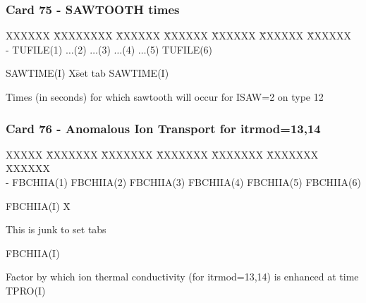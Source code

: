 \newpage \subsubsection{Card 75 - SAWTOOTH times}
\begin{tabbing}
XXXXXX \= XXXXXXXX \= XXXXXX \= XXXXXX \= XXXXXX \= XXXXXX \=
XXXXXX       \\
\footnotesize - \>\footnotesize  TUFILE(1) \>\footnotesize $\ldots$(2) \>\footnotesize
$\ldots$(3) \>\footnotesize $\ldots$(4) \>\footnotesize $\ldots$(5) \>\footnotesize TUFILE(6)
\\
\end{tabbing}
\begin{tabbing}
SAWTIME(I) X\= set tab \kill
SAWTIME(I) \> \parbox[t]{\width}{Times (in seconds) for which sawtooth will
occur for ISAW=2 on type 12}
\end{tabbing}
\pagebreak
\subsubsection{Card 76 - Anomalous Ion Transport for itrmod=13,14}
\begin{tabbing}
XXXXX \= XXXXXXX \= XXXXXXX \= XXXXXXX \= XXXXXXX \= XXXXXXX \=
XXXXXX       \\
\footnotesize  - \>\footnotesize FBCHIIA(1)  \>\footnotesize FBCHIIA(2) \>\footnotesize
FBCHIIA(3) \>\footnotesize FBCHIIA(4) \>\footnotesize FBCHIIA(5) \>\footnotesize FBCHIIA(6)
\end{tabbing}
\begin{tabbing}
FBCHIIA(I) X\= \parbox[t]{\width}{This is junk to set tabs} \kill
FBCHIIA(I) \>\parbox[t]{\width}{Factor by which ion thermal conductivity (for itrmod=13,14) is enhanced at time TPRO(I)} \\
\end{tabbing}

